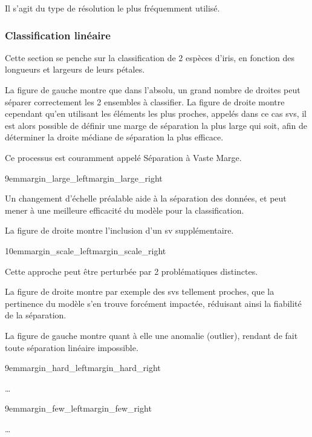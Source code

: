 Il s’agit du type de résolution le plus fréquemment utilisé.

\subsubsection{Classification linéaire}

Cette section se penche sur la classification de 2 espèces d’iris,
en fonction des longueurs et largeurs de leurs pétales.

La figure de gauche montre que dans l’absolu, un grand nombre de droites
peut séparer correctement les 2 ensembles à classifier.
La figure de droite montre cependant qu’en utilisant les éléments
les plus proches, appelés dans ce cas \glspl{sv}, il est alors possible
de définir une marge de séparation la plus large qui soit, afin de
déterminer la droite médiane de séparation la plus efficace.

Ce processus est couramment appelé Séparation à Vaste Marge.

{9em}{margin_large_left}{margin_large_right}

Un changement d’échelle préalable aide à la séparation des données,
et peut mener à une meilleure efficacité du modèle pour la classification.
\cite{scaling}

La figure de droite montre l’inclusion d’un \gls{sv} supplémentaire.

{10em}{margin_scale_left}{margin_scale_right}

\pagebreak

Cette approche peut être perturbée par 2 problématiques distinctes.

La figure de droite montre par exemple des \glspl{sv} tellement proches,
que la pertinence du modèle s’en trouve forcément impactée, réduisant
ainsi la fiabilité de la séparation.

La figure de gauche montre quant à elle une anomalie (outlier),
rendant de fait toute séparation linéaire impossible.

{9em}{margin_hard_left}{margin_hard_right}

…

{9em}{margin_few_left}{margin_few_right}

…

\pagebreak


